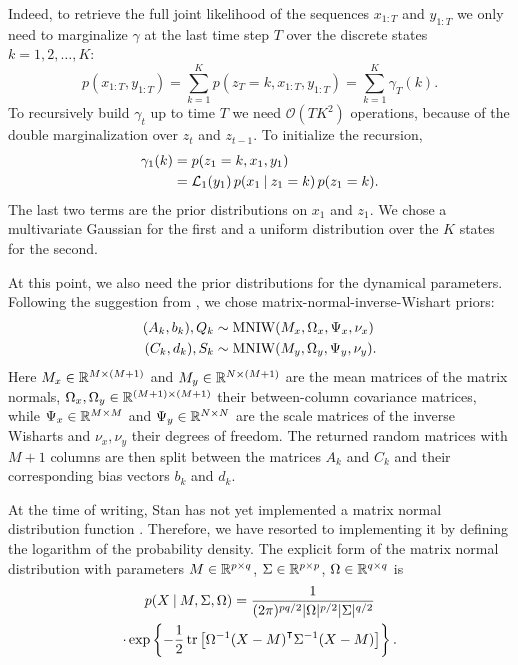 \documentclass[
  10pt, twocolumn, headings=normal,
  footlines=1, DIV=calc
]{scrartcl}
\begin{document}
Indeed, to retrieve the full joint likelihood of the sequences $x_{1:T}$ and
$y_{1:T}$ we only need to marginalize $\gamma$ at the last time step $T$ over
the discrete states $k = 1, 2, \ldots, K$:
\begin{equation}
  p(x_{1:T}, y_{1:T}) = \sum_{k=1}^{K} p(z_{T} = k, x_{1:T}, y_{1:T})
    = \sum_{k=1}^{K} \gamma_{T} (k).
\end{equation}
To recursively build $\gamma_{t}$ up to time $T$ we need
$\mathcal{O}(TK^{2})$ operations, because of the double marginalization over
$z_{t}$ and $z_{t-1}$. To initialize the recursion,
\begin{equation}
  \begin{split}
    \gamma_{1}(k) &= p(z_{1} = k, x_{1}, y_{1}) \\
                  &= \mathcal{L}_{1}(y_{1}) \,
                    p(x_{1} \:\vert\: z_{1} = k) \, p(z_{1} = k).
  \end{split}
  \label{eq:gamma-1}
\end{equation}
The last two terms are the prior distributions on $x_{1}$ and $z_{1}$. We chose
a multivariate Gaussian for the first and a uniform distribution over the $K$
states for the second. 

At this point, we also need the prior distributions for the dynamical
parameters. Following the suggestion from \textcite{Linderman17}, we chose
matrix-normal-inverse-Wishart priors:
\begin{align}
  (A_{k}, b_{k}), Q_{k} &\sim \operatorname{MNIW}(M_{x}, \Omega_{x}, \Psi_{x}, \nu_{x}) \\
  (C_{k}, d_{k}), S_{k} &\sim \operatorname{MNIW}(M_{y}, \Omega_{y}, \Psi_{y}, \nu_{y}).
\end{align}
Here $M_{x} \in \mathbb{R}^{M \times (M + 1)}$ and $M_{y} \in \mathbb{R}^{N \times (M + 1)}$ are
the mean ma\-tri\-ces of the matrix normals, $\Omega_x, \Omega_y \in \mathbb{R}^{(M + 1)
\times (M + 1)}$ their be\-tween-column covariance matrices, while $\Psi_x \in
\mathbb{R}^{M \times M}$ and $\Psi_{y} \in \mathbb{R}^{N \times N}$ are the scale matrices of
the inverse Wisharts and $\nu_{x}, \nu_{y}$ their degrees of freedom. The
returned random matrices with $M + 1$ columns are then split between the
matrices $A_{k}$ and $C_{k}$ and their corresponding bias vectors $b_{k}$ and
$d_{k}$.

At the time of writing, Stan has not yet implemented a matrix normal
distribution function \autocite{Lee17}. Therefore, we have resorted to
implementing it by defining the logarithm of the probability density. The
explicit form of the matrix normal distribution with parameters $M \in \mathbb{R}^{p
\times q}$, $\Sigma \in \mathbb{R}^{p \times p}$, $\Omega \in \mathbb{R}^{q \times q}$ is
\autocite{DeWaal06}
\begin{multline}
  p(X \given M, \Sigma, \Omega) =
    \frac{1}{(2 \pi)^{pq/2} \abs{\Omega}^{p/2} \abs{\Sigma}^{q/2}} \\
    \cdot \exp\left\{-\frac{1}{2}\tr\left[\Omega^{-1} (X - M)^\tran
                     \Sigma^{-1} (X - M)\right]\right\}.
\end{multline}
\end{document}
